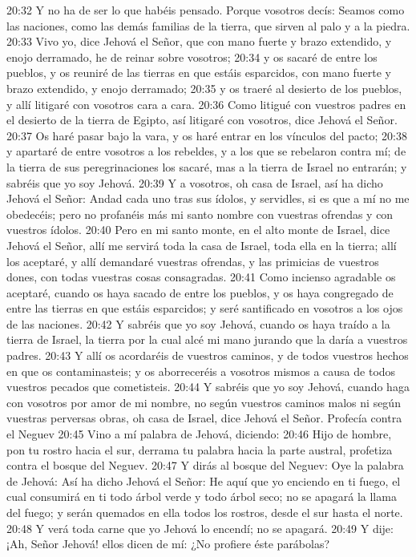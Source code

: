 20:32 Y no ha de ser lo que habéis pensado. Porque vosotros decís: Seamos como las naciones, como las demás familias de la tierra, que sirven al palo y a la piedra.  
20:33 Vivo yo, dice Jehová el Señor, que con mano fuerte y brazo extendido, y enojo derramado, he de reinar sobre vosotros;  
20:34 y os sacaré de entre los pueblos, y os reuniré de las tierras en que estáis esparcidos, con mano fuerte y brazo extendido, y enojo derramado;  
20:35 y os traeré al desierto de los pueblos, y allí litigaré con vosotros cara a cara.  
20:36 Como litigué con vuestros padres en el desierto de la tierra de Egipto, así litigaré con vosotros, dice Jehová el Señor.  
20:37 Os haré pasar bajo la vara, y os haré entrar en los vínculos del pacto;  
20:38 y apartaré de entre vosotros a los rebeldes, y a los que se rebelaron contra mí; de la tierra de sus peregrinaciones los sacaré, mas a la tierra de Israel no entrarán; y sabréis que yo soy Jehová.  
20:39 Y a vosotros, oh casa de Israel, así ha dicho Jehová el Señor: Andad cada uno tras sus ídolos, y servidles, si es que a mí no me obedecéis; pero no profanéis más mi santo nombre con vuestras ofrendas y con vuestros ídolos.  
20:40 Pero en mi santo monte, en el alto monte de Israel, dice Jehová el Señor, allí me servirá toda la casa de Israel, toda ella en la tierra; allí los aceptaré, y allí demandaré vuestras ofrendas, y las primicias de vuestros dones, con todas vuestras cosas consagradas.  
20:41 Como incienso agradable os aceptaré, cuando os haya sacado de entre los pueblos, y os haya congregado de entre las tierras en que estáis esparcidos; y seré santificado en vosotros a los ojos de las naciones.  
20:42 Y sabréis que yo soy Jehová, cuando os haya traído a la tierra de Israel, la tierra por la cual alcé mi mano jurando que la daría a vuestros padres.  
20:43 Y allí os acordaréis de vuestros caminos, y de todos vuestros hechos en que os contaminasteis; y os aborreceréis a vosotros mismos a causa de todos vuestros pecados que cometisteis.  
20:44 Y sabréis que yo soy Jehová, cuando haga con vosotros por amor de mi nombre, no según vuestros caminos malos ni según vuestras perversas obras, oh casa de Israel, dice Jehová el Señor.  
Profecía contra el Neguev  
20:45 Vino a mí palabra de Jehová, diciendo:  
20:46 Hijo de hombre, pon tu rostro hacia el sur, derrama tu palabra hacia la parte austral, profetiza contra el bosque del Neguev.  
20:47 Y dirás al bosque del Neguev: Oye la palabra de Jehová: Así ha dicho Jehová el Señor: He aquí que yo enciendo en ti fuego, el cual consumirá en ti todo árbol verde y todo árbol seco; no se apagará la llama del fuego; y serán quemados en ella todos los rostros, desde el sur hasta el norte.  
20:48 Y verá toda carne que yo Jehová lo encendí; no se apagará.  
20:49 Y dije: ¡Ah, Señor Jehová! ellos dicen de mí: ¿No profiere éste parábolas?  

